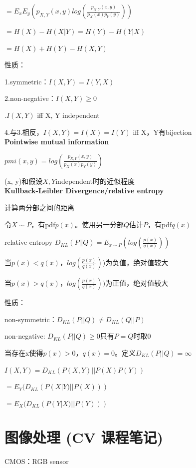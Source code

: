 \documentclass[UTF8]{ctexart}
\begin{document}
  \quad $ = E_xE_y(p_{X, Y}(x, y)log(\frac{p_{X, Y}(x, y)}{p_X(x)p_Y(y)}))$

  \quad $ = H(X) - H(X | Y) = H(Y) - H(Y | X)$

  \quad $ = H(X) + H(Y) - H(X, Y)$

  性质：

  \quad 1.symmetric：$I(X, Y) = I(Y, X)$

  \quad 2.non-negative：$I(X, Y) \geq 0$

  .$I(X, Y)$ iff X, Y independent

  \quad 4.与3.相反，$I(X, Y) = I(X) = I(Y)$ iff X，Y有bijection\\
\textbf{Pointwise mutual information}

  $pmi(x, y) = log(\frac{p_{X, Y}(x, y)}{p_X(x)p_Y(y)})$

  (x, y)和假设$X, Y$independent时的近似程度\\
\textbf{Kullback-Leibler Divergence/relative entropy}

  计算两分部之间的距离

  令$X \sim P$，有pdf$p(x)$。使用另一分部$Q$估计$P$，有pdf$q(x)$

  relative entropy $D_{KL}(P || Q) = E_{x \sim P}(log(\frac{p(x)}{q(x)}))$

  \quad 当$p(x) < q(x)$，$log(\frac{p(x)}{q(x)}))$为负值，绝对值较大
  
  \quad 当$p(x) > q(x)$，$log(\frac{p(x)}{q(x)}))$为正值，绝对值较大

  性质：

  \quad non-symmetric：$D_{KL}(P||Q) \neq D_{KL}(Q || P)$

  \quad non-negative: $D_{KL}(P||Q) \geq 0$只有$P = Q$时取0

  \quad 当存在x使得$p(x) > 0$，$q(x) = 0$。定义$D_{KL}(P||Q) = \infty$

  \quad $I(X, Y) = D_{KL}(P(X, Y) || P(X)P(Y))$

  \quad \quad $ = E_Y(D_{KL}(P(X | Y) || P(X)))$

  \quad \quad $ = E_X(D_{KL}(P(Y | X) || P(Y)))$

\section{图像处理 (CV 课程笔记)}
\noindent CMOS：RGB sensor
\end{document}
